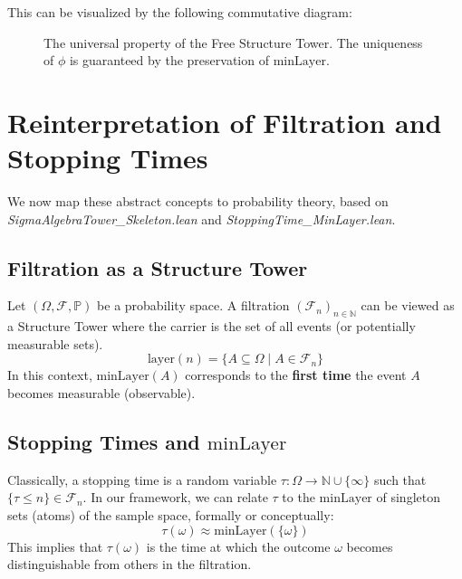 \documentclass[11pt, a4paper]{article}
\theoremstyle{definition}
\theoremstyle{plain}
\newcommand{\N}{\mathbb{N}}
\renewcommand{\P}{\mathbb{P}}
\newcommand{\F}{\mathcal{F}}
\newcommand{\minLayer}{\mathrm{minLayer}}
\begin{document}
This can be visualized by the following commutative diagram:

\begin{figure}[h]
    \centering
    \caption{The universal property of the Free Structure Tower. The uniqueness of $\phi$ is guaranteed by the preservation of $\minLayer$.}
    \label{fig:universal_property}
\end{figure}

\section{Reinterpretation of Filtration and Stopping Times}

We now map these abstract concepts to probability theory, based on \textit{SigmaAlgebraTower\_Skeleton.lean} and \textit{StoppingTime\_MinLayer.lean}.

\subsection{Filtration as a Structure Tower}

Let $(\Omega, \F, \P)$ be a probability space. A filtration $(\F_n)_{n \in \N}$ can be viewed as a Structure Tower where the carrier is the set of all events (or potentially measurable sets).
\[
\mathrm{layer}(n) = \{ A \subseteq \Omega \mid A \in \F_n \}
\]
In this context, $\minLayer(A)$ corresponds to the \textbf{first time} the event $A$ becomes measurable (observable).

\subsection{Stopping Times and $\minLayer$}

Classically, a stopping time is a random variable $\tau: \Omega \to \N \cup \{\infty\}$ such that $\{ \tau \le n \} \in \F_n$.
In our framework, we can relate $\tau$ to the $\minLayer$ of singleton sets (atoms) of the sample space, formally or conceptually:
\[
\tau(\omega) \approx \minLayer(\{ \omega \})
\]
This implies that $\tau(\omega)$ is the time at which the outcome $\omega$ becomes distinguishable from others in the filtration.
\end{document}
